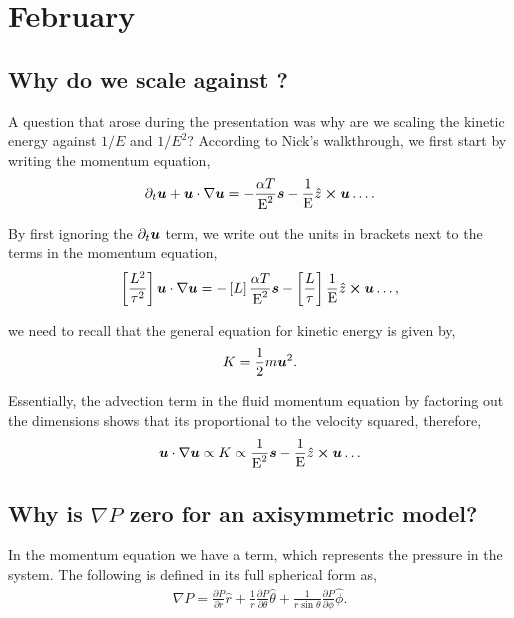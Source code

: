 \section{February}

\subsection{Why do we scale against \ekman?}
\kevek
A question that arose during the presentation was why are we scaling the kinetic energy against $1/E$ and $1/E^2$? According to Nick's walkthrough, we first start by writing the momentum equation, 
\begin{align}
	\partial_t \boldsymbol{u} + \boldsymbol{u} \cdot \nabla \boldsymbol{u} = - \frac{\alpha T}{\text{E}^2} \boldsymbol{s} - \frac{1}{\text{E}} \hat{z} \cross \boldsymbol{u} \dots. 
\end{align}

By first ignoring the $\partial_t \boldsymbol{u}$ term, we write out the units in brackets next to the terms in the momentum equation, 
\begin{align}
	\left[\frac{L^2}{\tau^2} \right] \boldsymbol{u} \cdot \nabla \boldsymbol{u} = - \left[L \right] \frac{\alpha T}{\text{E}^2} \boldsymbol{s} - \left[\frac{L}{\tau} \right] \frac{1}{\text{E}} \hat{z} \cross \boldsymbol{u} \dots,  
\end{align}

we need to recall that the general equation for kinetic energy is given by, 
\begin{align}
	K = \frac{1}{2} m \boldsymbol{u}^2. 
\end{align}

Essentially, the advection term in the fluid momentum equation by factoring out the dimensions shows that its proportional to the velocity squared, therefore, 
\begin{align}
	\boldsymbol{u} \cdot \nabla \boldsymbol{u} \propto K \propto \frac{1}{\text{E}^2} \boldsymbol{s} - \frac{1}{\text{E}} \hat{z} \cross \boldsymbol{u} \dots
\end{align}

\subsection{Why is $\nabla P$ zero for an axisymmetric model?}
In the momentum equation we have a term, which represents the pressure in the system. The following is defined in its full spherical form as, 
\begin{align}
	\nabla P = \frac{\partial P}{\partial r} \hat{r} + \frac{1}{r} \frac{\partial P}{\partial \theta} \hat{\theta} + \frac{1}{r \sin{\theta}} \frac{\partial P}{\partial \phi} \hat{\phi}.
\end{align}

